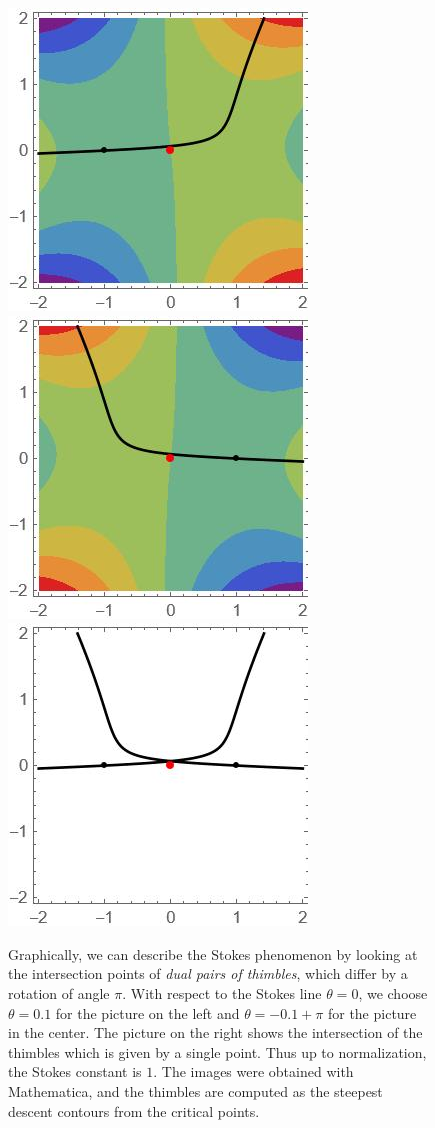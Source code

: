 \documentclass{article}
\theoremstyle{definition}
\begin{document}
\begin{figure}[ht]
    \centering
    \includegraphics[scale=0.7]{figures/contour1--airy.jpg}
    \includegraphics[scale=0.7]{figures/contour2--airy.jpg}
     \includegraphics[scale=0.7]{figures/contour--Airy--intersection.jpg}
    \caption{Graphically, we can describe the Stokes phenomenon by looking at the intersection points of \textit{dual pairs of thimbles}, which differ by a rotation of angle $\pi$. With respect to the Stokes line $\theta=0$, we choose $\theta=0.1$ for the picture on the left and $\theta=-0.1+\pi$ for the picture in the center. The picture on the right shows the intersection of the thimbles which is given by a single point. Thus up to normalization, the Stokes constant is $1$. The images were obtained with Mathematica, and the thimbles are computed as the steepest descent contours from the critical points.}
    \label{fig:intersection_thimbles-Airy}
\end{figure}
\end{document}
